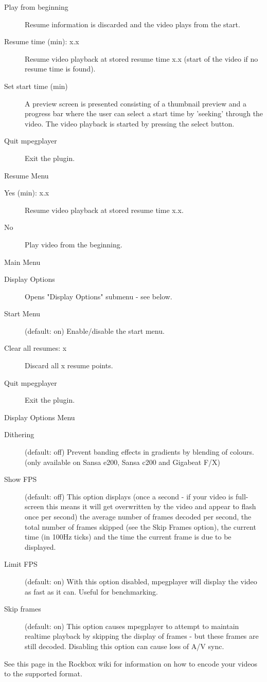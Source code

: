 \begin{description}
\item[Play from beginning] Resume information is discarded and the video plays
    from the start.
\item[Resume time (min): x.x] Resume video playback at stored resume time x.x
    (start of the video if no resume time is found).
\item[Set start time (min)] A preview screen is presented consisting of a
    thumbnail preview and a progress bar where the user can select a start time
    by 'seeking' through the video. The video playback is started by pressing
    the select button.
\item[Quit mpegplayer] Exit the plugin.
\end{description}

Resume Menu

\begin{description}
\item[Yes (min): x.x] Resume video playback at stored resume time x.x.
\item[No] Play video from the beginning.
\end{description}

Main Menu

\begin{description}
\item[Display Options] Opens "Display Options" submenu - see below.
\item[Start Menu] (default: on) Enable/disable the start menu.
\item[Clear all resumes: x] Discard all x resume points.
\item[Quit mpegplayer] Exit the plugin.
\end{description}

Display Options Menu

\begin{description}
\item[Dithering] (default: off) Prevent banding effects in gradients by blending
    of colours. (only available on Sansa e200, Sansa c200 and Gigabeat F/X)
\item[Show FPS] (default: off) This option displays (once a second - if your
    video is full-screen this means it will get overwritten by the video and
    appear to flash once per second) the average number of frames decoded per
    second, the total number of frames skipped (see the Skip Frames option),
    the current time (in 100Hz ticks) and the time the current frame is due to
    be displayed.
\item[Limit FPS] (default: on) With this option disabled, mpegplayer will
    display the video as fast as it can. Useful for benchmarking.
\item[Skip frames] (default: on) This option causes mpegplayer to attempt to
    maintain realtime playback by skipping the display of frames - but these
    frames are still decoded. Disabling this option can cause loss of A/V sync. 
\end{description}

See this page in the Rockbox wiki for information on how to encode your videos
to the supported format. 
